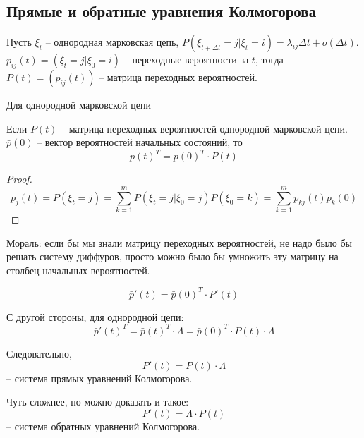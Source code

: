 \subsection{Прямые и обратные уравнения Колмогорова}

\begin{definition}
  Пусть $\xi_t$ -- однородная марковская цепь,
  $P(\xi_{t+\Delta t} = j | \xi_t = i) = \lambda_{ij} \Delta t + o(\Delta t)$.
  $p_{ij}(t) = (\xi_t = j | \xi_0 = i)$ -- переходные вероятности за $t$,
  тогда $P(t) = (p_{ij}(t))$ -- матрица переходных вероятностей.
\end{definition}

\begin{theorem}
  Для однородной марковской цепи

  Если $P(t)$ -- матрица переходных вероятностей однородной марковской цепи.
  $\bar{p}(0)$ -- вектор вероятностей начальных состояний, то
  \[
    \bar{p}(t)^T = \bar{p}(0)^T \cdot P(t)
  \]
\end{theorem}
\begin{proof}
  \[
    p_j(t) = P(\xi_t = j) = \sum_{k=1}^m P(\xi_t = j | \xi_0=j) P(\xi_0=k)
    = \sum_{k=1}^m p_{kj}(t) p_k(0)
  \]
\end{proof}

Мораль: если бы мы знали матрицу переходных вероятностей, не надо было бы 
решать систему диффуров, просто можно было бы умножить эту матрицу на столбец
начальных вероятностей.

\begin{corollary}
  \[
    \bar{p}'(t) = \bar{p}(0)^T \cdot P'(t)
  \]

  С другой стороны, для однородной цепи:
  \[
    \bar{p}'(t)^T = \bar{p}(t)^T \cdot \Lambda = \bar{p}(0)^T \cdot P(t) \cdot \Lambda
  \]

  Следовательно, 
  \[
    P'(t) = P(t) \cdot \Lambda
  \]
  -- система прямых уравнений Колмогорова.

  Чуть сложнее, но можно доказать и такое:
  \[
    P'(t) = \Lambda \cdot P(t)
  \]
  -- система обратных уравнений Колмогорова.
\end{corollary}

